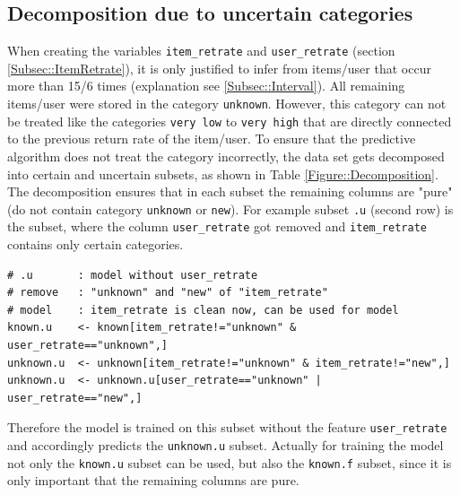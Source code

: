 \documentclass[a4paper,12pt]{article}
\begin{document}
\subsection{Decomposition due to uncertain categories}\label{Subsec::4Split}
When creating the variables \texttt{item\_retrate} and \texttt{user\_retrate} (section \ref{Subsec::ItemRetrate}), it is only justified to infer from items/user that occur more than 15/6 times (explanation see \ref{Subsec::Interval}). All remaining items/user were stored in the category \texttt{unknown}. However, this category can not be treated like the categories \texttt{very low} to \texttt{very high} that are directly connected to the previous return rate of the item/user. To ensure that the predictive algorithm does not treat the category incorrectly, the data set gets decomposed into certain and uncertain subsets, as shown in Table \ref{Figure::Decomposition}. The decomposition ensures that in each subset the remaining columns are "pure" (do not contain category \texttt{unknown} or \texttt{new}). For example subset \texttt{.u} (second row) is the subset, where the column \texttt{user\_retrate} got removed and \texttt{item\_retrate} contains only certain categories. 
\begin{lstlisting}
# .u       : model without user_retrate
# remove   : "unknown" and "new" of "item_retrate"
# model    : item_retrate is clean now, can be used for model
known.u    <- known[item_retrate!="unknown" & user_retrate=="unknown",]
unknown.u  <- unknown[item_retrate!="unknown" & item_retrate!="new",]
unknown.u  <- unknown.u[user_retrate=="unknown" | user_retrate=="new",]
\end{lstlisting}
Therefore the model is trained on this subset without the feature \texttt{user\_retrate} and accordingly predicts the \texttt{unknown.u} subset. Actually for training the model not only the \texttt{known.u} subset can be used, but also the \texttt{known.f} subset, since it is only important that the remaining columns are pure.\\
\end{document}
